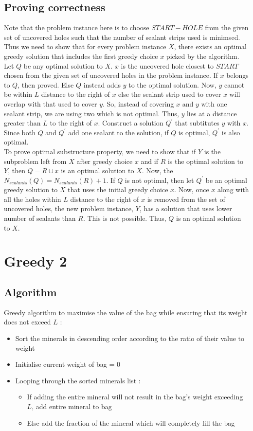\documentclass[a4paper]{article}
\begin{document}
\subsection*{Proving correctness}
Note that the problem instance here is to choose $START-HOLE$ from the given set of uncovered holes such that the number of sealant strips used is minimsed. Thus we need to show that for every problem instance $X$, there exists an optimal greedy solution that includes the first greedy choice $x$ picked by the algorithm. Let $Q$ be any optimal solution to $X$. $x$ is the uncovered hole closest to $START$ chosen from the given set of uncovered holes in the problem instance. If $x$ belongs to $Q$, then proved. Else $Q$ instead adds $y$ to the optimal solution. Now, $y$ cannot be within $L$ distance to the right of $x$ else the sealant strip used to cover $x$ will overlap with that used to cover $y$. So, instead of covering $x$ and $y$ with one sealant strip, we are using two which is not optimal. Thus, $y$ lies at a distance greater than $L$ to the right of $x$. Construct a solution $Q^{'}$ that subtitutes $y$ with $x$. Since both $Q$ and $Q^{'}$ add one sealant to the solution, if $Q$ is optimal, $Q^{'}$ is also optimal. \\
To prove optimal substructure property, we need to show that if $Y$ is the subproblem left from $X$ after greedy choice $x$ and if $R$ is the optimal solution to $Y$, then $Q = R \cup {x}$ is an optimal solution to $X$. Now, the $N_{sealants}(Q) = N_{sealants}(R) + 1$. If $Q$ is not optimal, then let $Q^{'}$ be an optimal greedy solution to $X$ that uses the initial greedy choice $x$. Now, once $x$ along with all the holes within $L$ distance to the right of $x$ is removed from the set of uncovered holes, the new problem instance, $Y$, has a solution that uses lower number of sealants than $R$. This is not possible. Thus, $Q$ is an optimal solution to $X$.

\section{Greedy 2}
\subsection*{Algorithm}
Greedy algorithm to maximise the value of the bag while ensuring that its weight does not exceed $L$ :
\begin{itemize}
\item Sort the minerals in descending order according to the ratio of their value to weight
\item Initialise current weight of bag = 0
\item Looping through the sorted minerals list :
\begin{itemize}
\item If adding the entire mineral will not result in the bag's weight exceeding $L$, add entire mineral to bag
\item Else add the fraction of the mineral which will completely fill the bag
\end{itemize}
\end{itemize}
\end{document}
